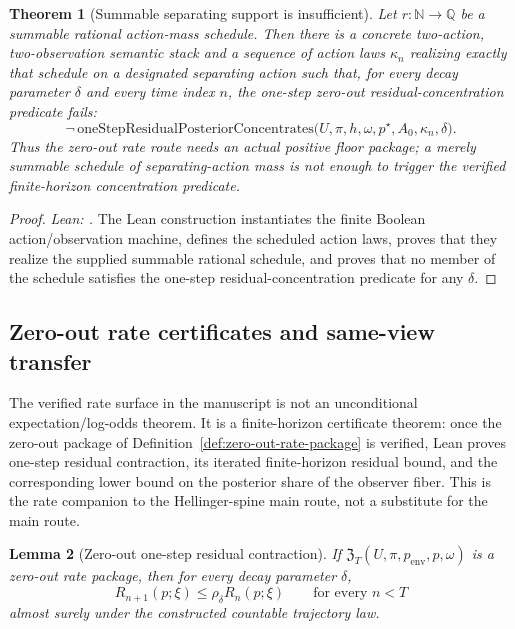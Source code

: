 \documentclass[11pt]{article}
\newtheorem{theorem}{Theorem}[section]
\newtheorem{lemma}[theorem]{Lemma}
\theoremstyle{definition}
\theoremstyle{remark}
\theoremstyle{plain}
\theoremstyle{definition}
\begin{document}
\begin{theorem}[Summable separating support is insufficient]
\label{thm:summable-support-insufficient}
Let $r:\mathbb N\to\mathbb Q$ be a summable rational action-mass schedule. Then there is a concrete two-action, two-observation semantic stack and a sequence of action laws $\kappa_n$ realizing exactly that schedule on a designated separating action such that, for every decay parameter $\delta$ and every time index $n$, the one-step zero-out residual-concentration predicate fails:
\[
\neg\,\mathrm{oneStepResidualPosteriorConcentrates}
\bigl(U,\pi,h,\omega,p^\star,A_0,\kappa_n,\delta\bigr).
\]
Thus the zero-out rate route needs an actual positive floor package; a merely summable schedule of separating-action mass is not enough to trigger the verified finite-horizon concentration predicate.
\end{theorem}

\begin{proof}
\noindent\emph{Lean: .}
The Lean construction instantiates the finite Boolean action/observation machine, defines the scheduled action laws, proves that they realize the supplied summable rational schedule, and proves that no member of the schedule satisfies the one-step residual-concentration predicate for any $\delta$.
\end{proof}



\subsection{Zero-out rate certificates and same-view transfer}
\label{sec:exp-rate}

The verified rate surface in the manuscript is not an unconditional expectation/log-odds theorem. It is a finite-horizon certificate theorem: once the zero-out package of Definition~\ref{def:zero-out-rate-package} is verified, Lean proves one-step residual contraction, its iterated finite-horizon residual bound, and the corresponding lower bound on the posterior share of the observer fiber. This is the rate companion to the Hellinger-spine main route, not a substitute for the main route.

\begin{lemma}[Zero-out one-step residual contraction]
\label{lem:one-step-drift}
If $\mathfrak Z_T(U,\pi,p_{\mathrm{env}},p,\omega)$ is a zero-out rate package, then for every decay parameter $\delta$,
\[
R_{n+1}(p;\xi)\le \rho_\delta R_n(p;\xi)
\qquad
\text{for every }n<T
\]
almost surely under the constructed countable trajectory law.
\end{lemma}
\end{document}
